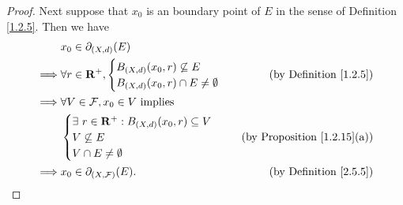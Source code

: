 \begin{proof}
    Next suppose that \(x_0\) is an boundary point of \(E\) in the sense of Definition \ref{1.2.5}.
    Then we have
    \begin{align*}
                 & x_0 \in \partial_{(X, d)}(E)                                                                 \\
        \implies & \forall r \in \mathbf{R}^+, \begin{cases}
                                           B_{(X, d)}(x_0, r) \not\subseteq E \\
                                           B_{(X, d)}(x_0, r) \cap E \neq \emptyset
                                       \end{cases}                & \text{(by Definition \ref{1.2.5})}          \\
        \implies & \forall V \in \mathcal{F}, x_0 \in V \text{ implies}                                         \\
                 & \begin{cases}
                       \exists\ r \in \mathbf{R}^+ : B_{(X, d)}(x_0, r) \subseteq V \\
                       V \not\subseteq E                                    \\
                       V \cap E \neq \emptyset
                   \end{cases} & \text{(by Proposition \ref{1.2.15}(a))}                                        \\
        \implies & x_0 \in \partial_{(X, \mathcal{F})}(E).                 & \text{(by Definition \ref{2.5.5})}
    \end{align*}


\end{proof}
